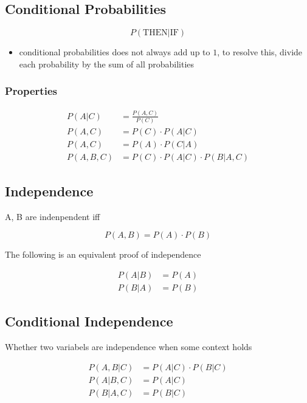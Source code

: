   \subsection{Conditional Probabilities}

    \begin{equation}
      P\left( \text{THEN} | \text{IF} \right)
    \end{equation}

    \begin{itemize}
      \item {} conditional probabilities does not always add up to
      $ 1 $, to resolve this, divide each probability by the sum of all
      probabilities
    \end{itemize}

    \subsubsection{Properties}

      \begin{align}
        P\left( A | C \right) &= \frac{P\left( A, C \right)}{P\left( C \right)} \\
        P\left( A, C \right) &= P(C) \cdot P(A | C) \\
        P\left( A, C \right) &= P(A) \cdot P(C | A) \\
        P\left( A, B, C \right) &= P(C) \cdot P(A | C) \cdot P(B | A, C)
      \end{align}

  \subsection{Independence}

    A, B are indenpendent iff

    \begin{equation}
      P(A, B) = P(A) \cdot P(B)
    \end{equation}

    The following is an equivalent proof of independence

    \begin{align}
      P(A|B) &= P(A) \\
      P(B|A) &= P(B)
    \end{align}

  \subsection{Conditional Independence}

    Whether two variabels are independence when some context holds

    \begin{align}
      P\left( A, B | C \right) &= P\left( A | C \right) \cdot P\left( B | C \right) \\
      P\left( A | B, C \right) &= P\left( A | C \right) \\
      P\left( B | A, C \right) &= P\left( B | C \right)
    \end{align}
